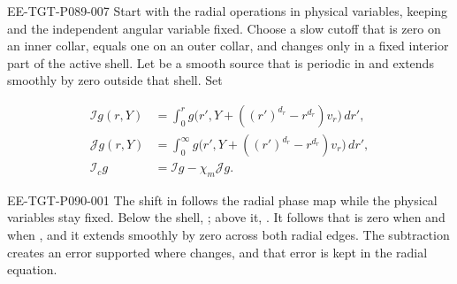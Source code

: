\begin{EESegment}{EE-TGT-P089-007}
Start with the radial operations in physical variables, keeping
 and the independent angular variable fixed. Choose a slow cutoff
 that is zero on an inner collar, equals one on an outer collar, and
changes only in a fixed interior part of the active shell. Let
 be a smooth source that is periodic in
 and extends smoothly by zero outside that shell. Set
%
\end{EESegment}
\begin{equation}
\begin{aligned}
  \mathcal I g(r,Y)
    &=\int_0^r g\bigl(r',Y+((r')^{d_r}-r^{d_r})v_r\bigr)\,dr',\\
  \mathcal J g(r,Y)
    &=\int_0^\infty g\bigl(r',Y+((r')^{d_r}-r^{d_r})v_r\bigr)\,dr',\\
  \mathcal I_c g&=\mathcal I g-\chi_m\mathcal J g.
\end{aligned}
\tag{8.4}\label{eq:8.4}
\end{equation}
\begin{EESegment}{EE-TGT-P090-001}
The shift in  follows the radial phase map while the physical variables
 stay fixed. Below the shell,
; above it,
. It follows that
 is zero when
 and when , and it extends
smoothly by zero across both radial edges. The subtraction creates an error supported where
 changes, and that error is kept in the radial equation.
\end{EESegment}


